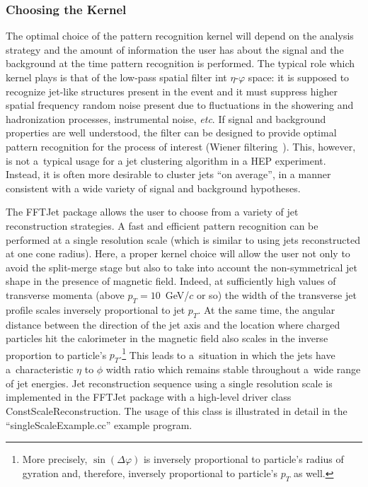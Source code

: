 \documentclass[epsf,12pt,titlepage]{article}
\newcommand{\cname}[1]{\index{#1}\textsf{#1}}
\begin{document}
\subsubsection{Choosing the Kernel}
\label{sec:kernelchoice}

The optimal choice of the pattern recognition kernel will depend on
the analysis strategy and the amount of information the user has about
the signal and the background at the time pattern
recognition is performed. The typical role which kernel plays is that
of the low-pass spatial filter int $\eta$-$\varphi$ space: it is
supposed to recognize jet-like structures present in the event and it
must suppress higher spatial frequency random noise present due to fluctuations
in the showering and hadronization processes, instrumental noise, {\it etc}.
If signal and background properties are well understood, the filter
can be designed to provide optimal pattern recognition for the
process of interest (Wiener filtering~\cite{ref:numrecipes}).
This, however, is not a~typical usage for a jet clustering algorithm
in a HEP experiment. Instead, it is often more desirable to cluster
jets ``on average'', in a manner consistent with a wide variety of
signal and background hypotheses.

The FFTJet package allows the user to choose from a variety of jet
reconstruction strategies. A fast and efficient pattern recognition
can be performed at a single resolution scale (which is similar to
using jets reconstructed at one cone radius). Here, a proper kernel
choice will allow the user not only to avoid the split-merge stage
but also to take into account the non-symmetrical jet shape in
the presence of magnetic field. Indeed, at sufficiently high
values of transverse momenta (above $p_{T} = 10$~GeV/$c$ or so) the width
of the transverse jet profile scales inversely proportional to
jet $p_{T}$. At the same time, the angular distance between the
direction of the jet axis and the location where charged particles
hit the calorimeter in the magnetic field also scales in the inverse
proportion to particle's $p_{T}.$\footnote{More precisely, 
$\sin(\Delta \varphi)$ is inversely proportional to
particle's radius of gyration and, therefore, inversely
proportional to particle's $p_{T}$ as well.} This leads to a~situation
in which the jets have a~characteristic $\eta$ to $\phi$ width ratio
which remains stable throughout a~wide range of jet energies.
Jet reconstruction sequence using a single resolution scale
is implemented in the FFTJet package with a high-level driver
class \cname{ConstScaleReconstruction}. The usage of this
class is illustrated in detail in the ``singleScaleExample.cc''
example program.
\end{document}
